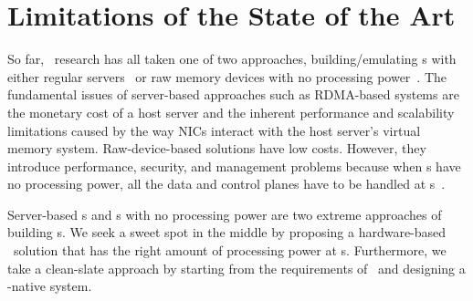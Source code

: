 \section{Limitations of the State of the Art}
So far, \md\ research has all taken one of two approaches,
building/emulating \MN{}s with either regular servers~\cite{AIFM,InfiniSwap,FastSwap,Shan18-OSDI,zombieland} 
or raw memory devices with no processing power~\cite{Tsai20-ATC,Lim09-disaggregate,Lim12-HPCA,HP-TheMachine}.
The fundamental issues of server-based approaches such as RDMA-based systems are the monetary cost of a host server and the inherent performance and scalability limitations caused by the way NICs interact with the host server's virtual memory system.
Raw-device-based solutions have low costs.
However, they introduce performance, security, and management problems
because when \MN{}s have no processing power, all the data and control planes have to be handled at \CN{}s~\cite{Tsai20-ATC}.

Server-based \MN{}s and \MN{}s with no processing power are two extreme approaches of building \MN{}s.
We seek a sweet spot in the middle by proposing a hardware-based \md\ solution that has the right amount of processing power at \MN{}s.
Furthermore, we take a clean-slate approach by starting from the requirements of \md\
and designing a \md-native system.

